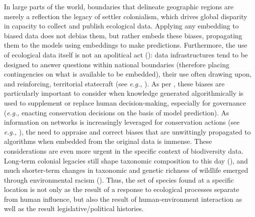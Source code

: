 \begin{refsection}
\begin{summary}
In large parts of the world, boundaries that delineate geographic
regions are merely a reflection the legacy of settler colonialism, which
drives global disparity in capacity to collect and publish ecological
data. Applying any embedding to biased data does not debias them, but
rather embeds these biases, propagating them to the models using
embeddings to make predictions. Furthermore, the use of ecological data
itself is not an apolitical act (\cite{Nost2021Political}): data
infrastructures tend to be designed to answer questions within national
boundaries (therefore placing contingencies on what is available to be
embedded), their use often drawing upon, and reinforcing, territorial
statecraft (see \emph{e.g.,} \cite{Barrett2005Environment}). As per
\cite{Machen2021Thinking}, these biases are particularly important to consider
when knowledge generated algorithmically is used to supplement or
replace human decision-making, especially for governance (\emph{e.g.,}
enacting conservation decisions on the basis of model prediction). As
information on networks is increasingly leveraged for conservation
actions (see \emph{e.g.,} \cite{Eero2021Use, Naman2022Food,
Stier2017Integrating}), the need to appraise and correct biases that
are unwittingly propagated to algorithms when embedded from the original
data is immense. These considerations are even more urgent in the
specific context of biodiversity data. Long-term colonial legacies still
shape taxonomic composition to this day (\cite{Lenzner2022Naturalized,
Raja2022Colonialism}), and much shorter-term changes in taxonomic and
genetic richness of wildlife emerged through environmental racism
(\cite{Schmidt2022Systemic}). Thus, the set of species found at a specific
location is not only as the result of a response to ecological processes
separate from human influence, but also the result of human-environment
interaction as well as the result legislative/political histories.
\end{summary}


\end{refsection}
